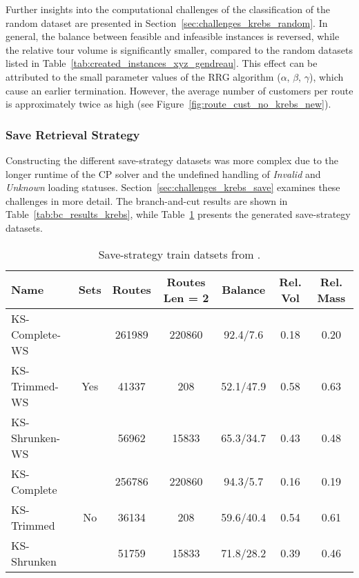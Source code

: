 Further insights into the computational challenges of the classification of the random dataset  are presented in Section~\ref{sec:challenges_krebs_random}.
In general, the balance between
feasible and infeasible instances is reversed, while the relative tour volume is significantly smaller, compared to the random datasets listed in Table~\ref{tab:created_instances_xyz_gendreau}.
This effect can be attributed to the small parameter values of the \gls{RRG}
algorithm ($\alpha$, $\beta$, $\gamma$), which cause an earlier termination. However, the average number of customers per route
is approximately twice as high (see Figure~\ref{fig:route_cust_no_krebs_new}).

\subsubsection{Save Retrieval Strategy}

Constructing the different save-strategy datasets was more complex due to the longer runtime of the \gls{CP} solver and the undefined
handling of \textit{Invalid} and \textit{Unknown} loading statuses. Section~\ref{sec:challenges_krebs_save} examines these
challenges in more detail. The branch-and-cut results are shown in Table~\ref{tab:bc_results_krebs}, while
Table~\ref{tab:saved_instances_krebs} presents the generated save-strategy datasets.

\begin{table}[ht]
    \centering
    \small
    \begin{tabular}{l c c c c c c }
        \toprule
        Name           & Sets                 & Routes & Routes Len = 2 & Balance   & Rel. Vol & Rel. Mass \\
        \midrule
        KS-Complete-WS & \multirow{3}{*}{Yes} & 261989 & 220860         & 92.4/7.6  & 0.18     & 0.20      \\
        KS-Trimmed-WS  &                      & 41337  & 208            & 52.1/47.9 & 0.58     & 0.63      \\
        KS-Shrunken-WS &                      & 56962  & 15833          & 65.3/34.7 & 0.43     & 0.48      \\        \midrule
        KS-Complete    & \multirow{3}{*}{No}  & 256786 & 220860         & 94.3/5.7  & 0.16     & 0.19      \\
        KS-Trimmed     &                      & 36134  & 208            & 59.6/40.4 & 0.54     & 0.61      \\
        KS-Shrunken    &                      & 51759  & 15833          & 71.8/28.2 & 0.39     & 0.46      \\

        \bottomrule
    \end{tabular}
    \caption{Save-strategy train datsets from \krebsADataSet.}
    \label{tab:saved_instances_krebs}
\end{table}

